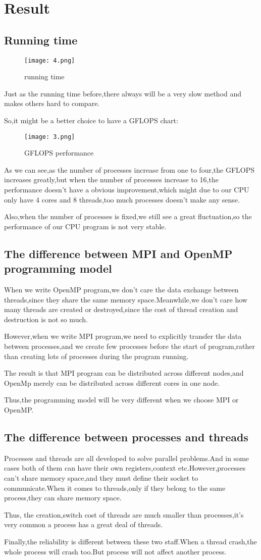 \documentclass[12pt]{scrartcl} %
\begin{document}
\section{Result}
\subsection{Running time}
\begin{figure}[H]
    \centering
    \texttt{[image: 4.png]}
    \caption{running time}
\end{figure}
Just as the running time before,there always will be a very slow method and makes others hard to compare.

So,it might be a better choice to have a GFLOPS chart:
\begin{figure}[H]
    \centering
    \texttt{[image: 3.png]}
    \caption{GFLOPS performance}
\end{figure}
As we can see,as the number of processes increase from one to four,the GFLOPS increases greatly,but when the number of processes increase to 16,the performance doesn't have a obvious improvement,which might due to our CPU only have 4 cores and 8 threads,too much processes doesn't make any sense.

Also,when the number of processes is fixed,we still see a great fluctuation,so the performance of our CPU program is not very stable.

\subsection{The difference between MPI and OpenMP  programming model}
When we write OpenMP program,we don't care the data exchange between threads,since they share the same memory space.Meanwhile,we don't care how many threads are created or destroyed,since the cost of thread creation and destruction is not so much.

However,when we write MPI program,we need to explicitly transfer the data between processes,and we create few processes before the start of program,rather than creating lots of processes during the program running.

The result is that MPI program can be distributed across different nodes,and OpenMp merely can be distributed across different cores in one node.

Thus,the programming model will be very different when we choose MPI or OpenMP.
\subsection{The difference between processes and threads}
Processes and threads are all developed to solve parallel problems.And in some cases both of them can have their own registers,context etc.However,processes can't share memory space,and they must define their socket to communicate.When it comes to threads,only if they belong to the same process,they can share memory space.

Thus, the creation,switch cost of threads are much smaller than processes,it's very common a process has a great deal of threads.

Finally,the reliability is different between these two staff.When a thread crash,the whole process will crash too.But process will not affect another process.
\end{document}
